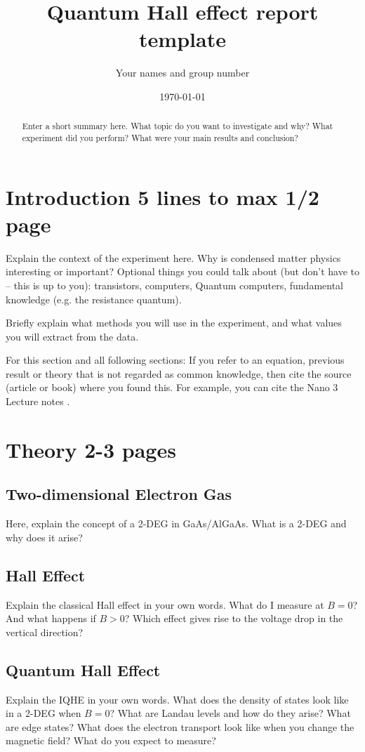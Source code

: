 \documentclass[a4paper]{article}
\title{Quantum Hall effect report template}
\author{Your names and group number}
\date{\today}
\begin{document}
\maketitle

\begin{abstract}
Enter a short summary here. What topic do you want to investigate and why? What experiment did you perform? What were your main results and conclusion?
\end{abstract}

\section{Introduction 5 lines to max 1/2 page}
\label{sec:introduction}

Explain the context of the experiment here. Why is condensed matter physics interesting or important?
Optional things you could talk about (but don't have to -- this is up to you): transistors, computers, Quantum computers, fundamental knowledge (e.g. the resistance quantum).

Briefly explain what methods you will use in the experiment, and what values you will extract from the data.

For this section and all following sections: If you refer to an equation, previous result or theory that is not regarded as common knowledge, then cite the source (article or book) where you found this. For example, you can cite the Nano 3 Lecture notes \cite{nano3}.

\section{Theory 2-3 pages}
\label{sec:theory}

\subsection{Two-dimensional Electron Gas}
Here, explain the concept of a 2-DEG in GaAs/AlGaAs. What is a 2-DEG and why does it arise?

\subsection{Hall Effect}
Explain the classical Hall effect in your own words. What do I measure at $B=0$? And what happens if $B>0$? Which effect gives rise to the voltage drop in the vertical direction?

\subsection{Quantum Hall Effect}
Explain the IQHE in your own words. What does the density of states look like in a 2-DEG when $B=0$? What are Landau levels and how do they arise? What are edge states? What does the electron transport look like when you change the magnetic field? What do you expect to measure?
\end{document}
